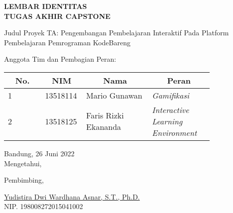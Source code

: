 \clearpage
\pagestyle{empty}

\begin{center}
  \smallskip

  \Large \bfseries \MakeUppercase{Lembar Identitas \\ Tugas Akhir Capstone}
  \vspace{\baselineskip}

  \normalsize \normalfont
  \begin{flushleft}
    Judul Proyek TA\qquad: Pengembangan Pembelajaran Interaktif Pada Platform Pembelajaran Pemrograman KodeBareng
    \medskip

    Anggota Tim dan Pembagian Peran:
    \bigskip
  \end{flushleft}

  \begin{center}
    \begin{tabular}{ |l|p{0.2\linewidth}|p{0.325\linewidth}|p{0.3\linewidth}| }
      \hline
      \multicolumn{1}{|c|}{\textbf{No.}} & \multicolumn{1}{c|}{\textbf{NIM}} & \multicolumn{1}{c|}{\textbf{Nama}} & \multicolumn{1}{c|}{\textbf{Peran}}       \\
      \hline
      1                                  & 13518114                          & Mario Gunawan                      & \textit{Gamifikasi}                       \\
      \hline
      2                                  & 13518125                          & Faris Rizki Ekananda               & \textit{Interactive Learning Environment} \\
      \hline
    \end{tabular}
  \end{center}

  \vfill
  Bandung, 26 Juni 2022 \\
  Mengetahui,

  \vspace{0.5cm}
  Pembimbing,

  \vspace{2cm}
  \underline{Yudistira Dwi Wardhana Asnar, S.T., Ph.D.} \\
  NIP. 198008272015041002
  \vspace{3cm}

\end{center}
\clearpage
